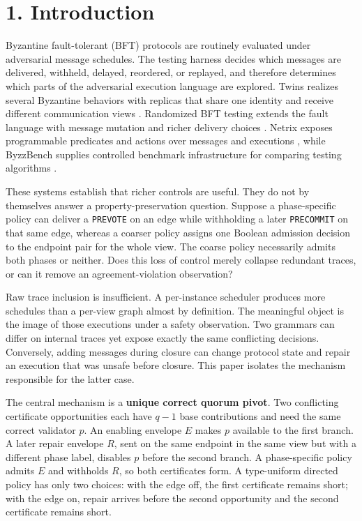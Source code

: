 \section{1. Introduction}\label{introduction}

Byzantine fault-tolerant (BFT) protocols are routinely evaluated under
adversarial message schedules. The testing harness decides which
messages are delivered, withheld, delayed, reordered, or replayed, and
therefore determines which parts of the adversarial execution language
are explored. Twins realizes several Byzantine behaviors with replicas
that share one identity and receive different communication views
\cite{bano2021twins}. Randomized BFT testing extends the fault language
with message mutation and richer delivery choices
\cite{winter2023randomized}. Netrix exposes programmable predicates and
actions over messages and executions \cite{dragoi2024netrix}, while
ByzzBench supplies controlled benchmark infrastructure for comparing
testing algorithms \cite{louroneto2025byzzbench}.

These systems establish that richer controls are useful. They do not by
themselves answer a property-preservation question. Suppose a
phase-specific policy can deliver a \texttt{PREVOTE} on an edge while
withholding a later \texttt{PRECOMMIT} on that same edge, whereas a
coarser policy assigns one Boolean admission decision to the endpoint
pair for the whole view. The coarse policy necessarily admits both
phases or neither. Does this loss of control merely collapse redundant
traces, or can it remove an agreement-violation observation?

Raw trace inclusion is insufficient. A per-instance scheduler produces
more schedules than a per-view graph almost by definition. The
meaningful object is the image of those executions under a safety
observation. Two grammars can differ on internal traces yet expose
exactly the same conflicting decisions. Conversely, adding messages
during closure can change protocol state and repair an execution that
was unsafe before closure. This paper isolates the mechanism responsible
for the latter case.

The central mechanism is a \textbf{unique correct quorum pivot}. Two
conflicting certificate opportunities each have \(q-1\) base
contributions and need the same correct validator \(p\). An enabling
envelope \(E\) makes \(p\) available to the first branch. A later repair
envelope \(R\), sent on the same endpoint in the same view but with a
different phase label, disables \(p\) before the second branch. A
phase-specific policy admits \(E\) and withholds \(R\), so both
certificates form. A type-uniform directed policy has only two choices:
with the edge off, the first certificate remains short; with the edge
on, repair arrives before the second opportunity and the second
certificate remains short.

